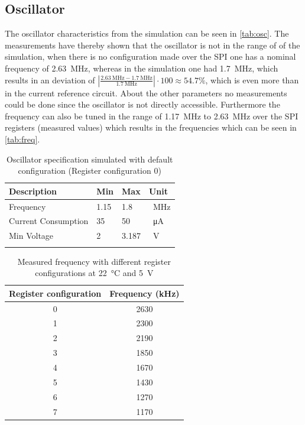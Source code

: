 \subsection{Oscillator}
\label{subsubsec:oscillator}
The oscillator characteristics from the simulation can be seen in \autoref{tab:osc}. The measurements have thereby shown that the oscillator is not in the range of of the simulation, when there is no configuration made over the SPI one has a nominal frequency of \qty{2.63}{\mega\hertz}, whereas in the simulation one had \qty{1.7}{\mega\hertz}, which results in an deviation of $\left|\frac{\qty{2.63}{\mega\hertz}-\qty{1.7}{\mega\hertz}}{\qty{1.7}{\mega\hertz}}\right|\cdot 100\approx 54.7 \%$, which is even more than in the current reference circuit. About the other parameters no measurements could be done since the oscillator is not directly accessible. Furthermore the frequency can also be tuned in the range of \qty{1.17}{\mega\hertz} to \qty{2.63}{\mega\hertz} over the SPI registers (measured values) which results in the frequencies which can be seen in \autoref{tab:freq}. 
\begin{longtable}{|p{5cm}|p{2.5cm}|p{2.5cm}|p{2.5cm}|}
	\hline
	\rowcolor{lightgray}
	\textbf{Description} &\textbf{Min} &\textbf{Max} & \textbf{Unit} \\ \hline
	
	Frequency & 1.15 & 1.8 &\qty{}{\mega\hertz} \\ \hline
	Current Consumption & 35 & 50 & \qty{}{\micro\ampere} \\ \hline
	Min Voltage & 2& 3.187 & \qty{}{\volt} \\ \hline
	\caption{Oscillator specification simulated with default configuration (Register configuration 0)} %
	\label{tab:osc}
\end{longtable}
\begin{table}[h]
	\centering
	\begin{tabular}{|c|c|}
		\hline
		\rowcolor{lightgray}
		\textbf{Register configuration} & \textbf{Frequency (kHz)} \\
		\hline
		0 & \qty{2630}{} \\
		\hline
		1 & \qty{2300}{} \\
		\hline
		2 & \qty{2190}{}\\
		\hline
		3 & \qty{1850}{} \\
		\hline
		4 & \qty{1670}{} \\
		\hline
		5 & \qty{1430}{}\\
		\hline
		6 & \qty{1270}{} \\
		\hline
		7 & \qty{1170}{}\\
		\hline
	\end{tabular}
	\caption{Measured frequency with different register configurations at \qty{22}{\degreeCelsius} and \qty{5}{\volt}}
	\label{tab:freq}
\end{table}


